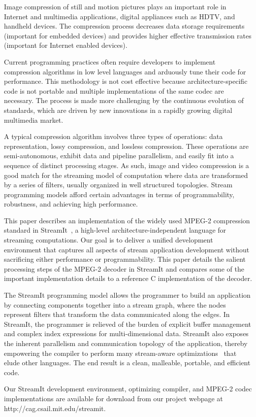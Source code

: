 
Image compression of still and motion pictures plays an important role
in Internet and multimedia applications, digital appliances such as
HDTV, and handheld devices. The compression process decreases data storage
requirements (important for embedded devices) and provides higher
effective transmission rates (important for Internet enabled devices).

Current programming practices often require developers to implement
compression algorithms in low level languages and arduously
tune their code for performance. This methodology is not cost
effective because architecture-specific code is not portable and 
multiple implementations of the same codec are necessary. 
The process is made more challenging by the continuous evolution
of standards, which are driven by new innovations in a rapidly growing 
digital multimedia market.

A typical compression algorithm involves three types of operations:
data representation, lossy compression, and lossless
compression. These operations are semi-autonomous, exhibit data and
pipeline parallelism, and easily fit into a sequence of distinct
processing stages. As such, image and video compression is a good
match for the streaming model of computation where data are transformed
by a series of filters, usually organized in well structured
topologies.  Stream programming models afford certain advantages in
terms of programmability, robustness, and achieving high performance.

This paper describes an implementation of the widely used MPEG-2
compression standard in StreamIt~\cite{streamitcc}, a high-level
architecture-independent language for streaming computations. Our goal
is to deliver a unified development environment that captures all
aspects of stream application development without sacrificing either
performance or programmability. This paper details the salient
processing steps of the MPEG-2 decoder in StreamIt and compares some
of the important implementation details to a reference C
implementation of the decoder.

The StreamIt programming model allows the programmer to build an
application by connecting components together into a stream graph,
where the nodes represent filters that transform the data communicated
along the edges. In StreamIt, the programmer is relieved of the burden
of explicit buffer management and complex index expressions for
multi-dimensional data.  StreamIt also exposes the inherent
parallelism and communication topology of the application, thereby
empowering the compiler to perform many stream-aware
optimizations~\cite{agrawal05cases,gordon02asplos,lamb03pldi,sermulins05lctes}
that elude other languages. The end result is a clean, malleable,
portable, and efficient code.

Our StreamIt development environment, optimizing compiler, and MPEG-2
codec implementations are available for download from our project
webpage at http://cag.csail.mit.edu/streamit.

